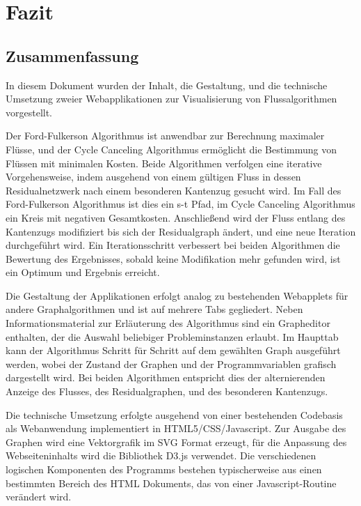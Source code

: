\chapter*{Fazit}

\section*{Zusammenfassung}

In diesem Dokument wurden der Inhalt, die Gestaltung, und die technische Umsetzung zweier Webapplikationen zur Visualisierung von Flussalgorithmen vorgestellt. 

Der Ford-Fulkerson Algorithmus ist anwendbar zur Berechnung maximaler Flüsse, und der Cycle Canceling Algorithmus ermöglicht die Bestimmung von Flüssen mit minimalen Kosten. Beide Algorithmen verfolgen eine iterative Vorgehensweise, indem ausgehend von einem gültigen Fluss in dessen Residualnetzwerk nach einem besonderen Kantenzug gesucht wird. Im Fall des Ford-Fulkerson Algorithmus ist dies ein s-t Pfad, im Cycle Canceling Algorithmus ein Kreis mit negativen Gesamtkosten. Anschließend wird der Fluss entlang des Kantenzugs modifiziert bis sich der Residualgraph ändert, und eine neue Iteration durchgeführt wird. Ein Iterationsschritt verbessert bei beiden Algorithmen die Bewertung des Ergebnisses, sobald keine Modifikation mehr gefunden wird, ist ein Optimum und Ergebnis erreicht.

Die Gestaltung der Applikationen erfolgt analog zu bestehenden Webapplets für andere Graphalgorithmen und ist auf mehrere Tabs gegliedert. Neben Informationsmaterial zur Erläuterung des Algorithmus sind ein Grapheditor enthalten, der die Auswahl beliebiger Probleminstanzen erlaubt. Im Haupttab kann der Algorithmus Schritt für Schritt auf dem gewählten Graph ausgeführt werden, wobei der Zustand der Graphen und der Programmvariablen grafisch dargestellt wird. Bei beiden Algorithmen entspricht dies der alternierenden Anzeige des Flusses, des Residualgraphen, und des besonderen Kantenzugs.

Die technische Umsetzung erfolgte ausgehend von einer bestehenden Codebasis als Webanwendung implementiert in HTML5/CSS/Javascript. Zur Ausgabe des Graphen wird eine Vektorgrafik im SVG Format erzeugt, für die Anpassung des Webseiteninhalts wird die Bibliothek D3.js verwendet. Die verschiedenen logischen Komponenten des Programms bestehen typischerweise aus einen bestimmten Bereich des HTML Dokuments, das von einer Javascript-Routine verändert wird.

